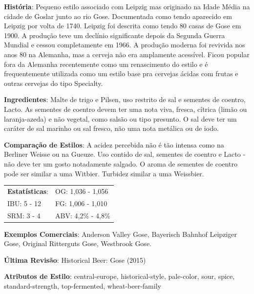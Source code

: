\textbf{História}: Pequeno estilo associado com Leipzig mas originado na Idade Média na cidade de Goslar junto ao rio Gose. Documentada como tendo aparecido em Leipzig por volta de 1740. Leipzig foi descrita como tendo 80 casas de Gose em 1900. A produção teve um declínio significante depois da Segunda Guerra Mundial e cessou completamente em 1966. A produção moderna foi revivida nos anos 80 na Alemanha, mas a cerveja não era amplamente acessível. Ficou popular fora da Alemanha recentemente como um renascimento do estilo e é frequentemente utilizada como um estilo base pra cervejas ácidas com frutas e outras cervejas do tipo Specialty.

\textbf{Ingredientes}: Malte de trigo e Pilsen, uso restrito de sal e sementes de coentro, Lacto. As sementes de coentro devem ter uma nota viva, fresca, cítrica (limão ou laranja-azeda) e não vegetal, como salsão ou tipo presunto. O sal deve ter um caráter de sal marinho ou sal fresco, não uma nota metálica ou de iodo.

\textbf{Comparação de Estilos}: A acidez percebida não é tão intensa como na Berliner Weisse ou na Gueuze. Uso contido de sal, sementes de coentro e Lacto - não deve ter um gosto notadamente salgado. O aroma de sementes de coentro pode ser similar a uma Witbier. Turbidez similar a uma Weissbier.

\begin{tabular}{@{}p{35mm}p{35mm}@{}}
  \textbf{Estatísticas}: & OG: 1,036 - 1,056 \\
  IBU: 5 - 12  & FG: 1,006 - 1,010  \\
  SRM: 3 - 4  & ABV: 4,2\% - 4,8\%
\end{tabular}

\textbf{Exemplos Comerciais}: Anderson Valley Gose, Bayerisch Bahnhof Leipziger Gose, Original Ritterguts Gose, Westbrook Gose.

\textbf{Última Revisão}: Historical Beer: Gose (2015)

\textbf{Atributos de Estilo}: central-europe, historical-style, pale-color, sour, spice, standard-strength, top-fermented, wheat-beer-family
